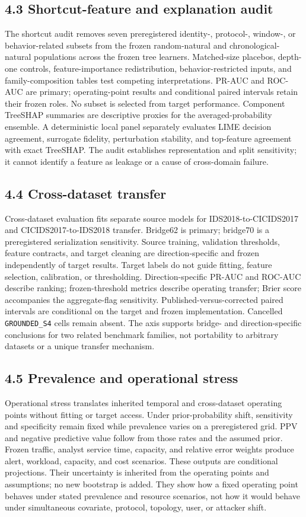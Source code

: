 \documentclass[preprint,12pt]{elsarticle}
\begin{document}
\subsection{4.3 Shortcut-feature and explanation audit}
The shortcut audit removes seven preregistered identity-, protocol-, window-, or behavior-related subsets from the frozen random-natural and chronological-natural populations across the frozen tree learners. Matched-size placebos, depth-one controls, feature-importance redistribution, behavior-restricted inputs, and family-composition tables test competing interpretations. PR-AUC and ROC-AUC are primary; operating-point results and conditional paired intervals retain their frozen roles. No subset is selected from target performance.
Component TreeSHAP summaries are descriptive proxies for the averaged-probability ensemble. A deterministic local panel separately evaluates LIME decision agreement, surrogate fidelity, perturbation stability, and top-feature agreement with exact TreeSHAP. The audit establishes representation and split sensitivity; it cannot identify a feature as leakage or a cause of cross-domain failure.

\subsection{4.4 Cross-dataset transfer}
Cross-dataset evaluation fits separate source models for IDS2018-to-CICIDS2017 and CICIDS2017-to-IDS2018 transfer. Bridge62 is primary; bridge70 is a preregistered serialization sensitivity. Source training, validation thresholds, feature contracts, and target cleaning are direction-specific and frozen independently of target results. Target labels do not guide fitting, feature selection, calibration, or thresholding.
Direction-specific PR-AUC and ROC-AUC describe ranking; frozen-threshold metrics describe operating transfer; Brier score accompanies the aggregate-flag sensitivity. Published-versus-corrected paired intervals are conditional on the target and frozen implementation. Cancelled \texttt{GROUNDED\_S4} cells remain absent. The axis supports bridge- and direction-specific conclusions for two related benchmark families, not portability to arbitrary datasets or a unique transfer mechanism.

\subsection{4.5 Prevalence and operational stress}
Operational stress translates inherited temporal and cross-dataset operating points without fitting or target access. Under prior-probability shift, sensitivity and specificity remain fixed while prevalence varies on a preregistered grid. PPV and negative predictive value follow from those rates and the assumed prior. Frozen traffic, analyst service time, capacity, and relative error weights produce alert, workload, capacity, and cost scenarios.
These outputs are conditional projections. Their uncertainty is inherited from the operating points and assumptions; no new bootstrap is added. They show how a fixed operating point behaves under stated prevalence and resource scenarios, not how it would behave under simultaneous covariate, protocol, topology, user, or attacker shift.
\end{document}
